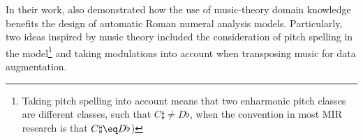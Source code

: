 

In their work, \textcite{micchi2020not} also demonstrated how the use of music-theory domain knowledge benefits the design of automatic Roman numeral analysis models. Particularly, two ideas inspired by music theory included the consideration of pitch spelling in the model\footnote{Taking pitch spelling into account means that two enharmonic pitch classes are different classes, such that $C\sharp \neq D\flat$, when the convention in most MIR research is that $C\sharp \eq D\flat$)} and taking modulations into account when transposing music for data augmentation.
